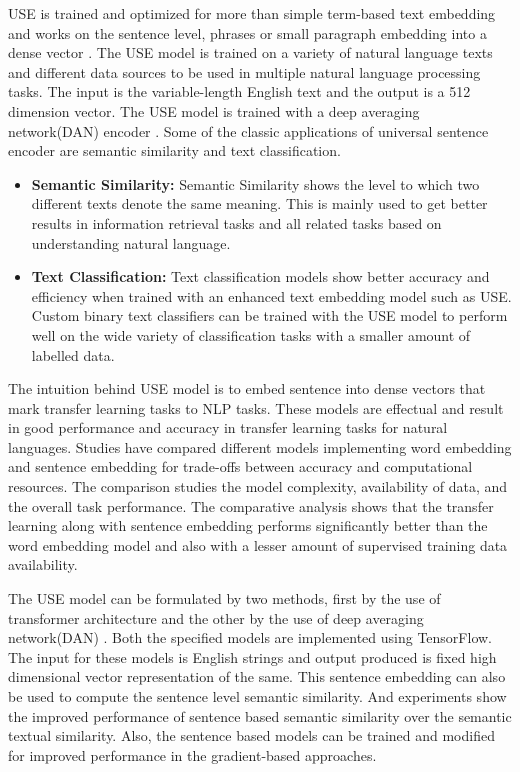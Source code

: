 USE is trained and optimized for more than simple term-based text embedding and works on the sentence level, phrases or small paragraph embedding into a dense vector \cite{RN32}. The USE model is trained on a variety of natural language texts and different data sources to be used in multiple natural language processing tasks. The input is the variable-length English text and the output is a 512 dimension vector. The USE model is trained with a deep averaging network(DAN) encoder \cite{RN32}.
Some of the classic applications of universal sentence encoder are semantic similarity and text classification.
\begin{itemize}
    \item \textbf{Semantic Similarity:} Semantic Similarity shows the level to which two different texts denote the same meaning. This is mainly used to get better results in information retrieval tasks and all related tasks based on understanding natural language. 
    \item \textbf{Text Classification:} Text classification models show better accuracy and efficiency when trained with an enhanced text embedding model such as USE.  Custom binary text classifiers can be trained with the USE model to perform well on the wide variety of classification tasks with a smaller amount of labelled data.
\end{itemize}

The intuition behind USE model is to embed sentence into dense vectors that mark transfer learning tasks to NLP tasks. These models are effectual and result in good performance and accuracy in transfer learning tasks for natural languages. Studies have compared different models implementing word embedding and sentence embedding for trade-offs between accuracy and computational resources. The comparison studies the model complexity, availability of data, and the overall task performance. The comparative analysis shows that the transfer learning along with sentence embedding performs significantly better than the word embedding model and also with a lesser amount of supervised training data availability.

The USE model can be formulated by two methods, first by the use of transformer architecture and the other by the use of deep averaging network(DAN) \cite{RN32}. Both the specified models are implemented using TensorFlow. The input for these models is English strings and output produced is fixed high dimensional vector representation of the same. This sentence embedding can also be used to compute the sentence level semantic similarity. And experiments show the improved performance of sentence based semantic similarity over the semantic textual similarity. Also, the sentence based models can be trained and modified for improved performance in the gradient-based approaches.

